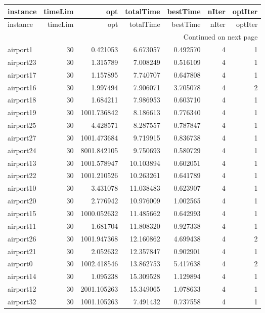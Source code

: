 \documentclass[../../../thesis.tex]{subfiles}
\begin{document}
\tiny
\begin{longtable}{|l|r|r|r|r|r|r|}
\toprule
instance & timeLim & opt & totalTime & bestTime & nIter & optIter \\
\midrule
\endfirsthead
\toprule
instance & timeLim & opt & totalTime & bestTime & nIter & optIter \\
\midrule
\endhead
\midrule
\multicolumn{7}{r}{Continued on next page} \\
\midrule
\endfoot
\bottomrule
\endlastfoot
airport1 & 30 & 0.421053 & 6.673057 & 0.492570 & 4 & 1 \\
airport23 & 30 & 1.315789 & 7.008249 & 0.516109 & 4 & 1 \\
airport17 & 30 & 1.157895 & 7.740707 & 0.647808 & 4 & 1 \\
airport16 & 30 & 1.997494 & 7.906071 & 3.705078 & 4 & 2 \\
airport18 & 30 & 1.684211 & 7.986953 & 0.603710 & 4 & 1 \\
airport19 & 30 & 1001.736842 & 8.186613 & 0.776340 & 4 & 1 \\
airport25 & 30 & 4.428571 & 8.287557 & 0.787847 & 4 & 1 \\
airport27 & 30 & 1001.473684 & 9.719915 & 0.836738 & 4 & 1 \\
airport24 & 30 & 8001.842105 & 9.750693 & 0.580729 & 4 & 1 \\
airport13 & 30 & 1001.578947 & 10.103894 & 0.602051 & 4 & 1 \\
airport22 & 30 & 1001.210526 & 10.263261 & 0.641789 & 4 & 1 \\
airport10 & 30 & 3.431078 & 11.038483 & 0.623907 & 4 & 1 \\
airport20 & 30 & 2.776942 & 10.976009 & 1.002565 & 4 & 1 \\
airport15 & 30 & 1000.052632 & 11.485662 & 0.642993 & 4 & 1 \\
airport11 & 30 & 1.681704 & 11.808320 & 0.927338 & 4 & 1 \\
airport26 & 30 & 1001.947368 & 12.160862 & 4.699438 & 4 & 2 \\
airport21 & 30 & 2.052632 & 12.357847 & 0.902901 & 4 & 1 \\
airport0 & 30 & 1002.418546 & 13.862753 & 5.417638 & 4 & 2 \\
airport14 & 30 & 1.095238 & 15.309528 & 1.129894 & 4 & 1 \\
airport12 & 30 & 2001.105263 & 15.349065 & 1.078633 & 4 & 1 \\
airport32 & 30 & 1001.105263 & 7.491432 & 0.737558 & 4 & 1 \\

\end{longtable}
\end{document}
